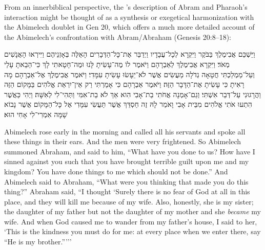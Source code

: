 From an innerbiblical perspective, the \ga's description of Abram and Pharaoh's interaction might be thought of as a synthesis or exegetical harmonization with the Abimelech doublet in Gen 20, which offers a much more detailed account of the Abimelech's confrontation with Abram/Abraham (Genesis 20:8--18):

\begin{hebrewtext}
    וַיַּשְׁכֵּם אֲבִימֶלֶךְ בַּבֹּקֶר וַיִּקְרָא לְכָל־עֲבָדָיו וַיְדַבֵּר אֶת־כָּל־הַדְּבָרִים הָאֵלֶּה בְּאָזְנֵיהֶם וַיִּירְאוּ הָאֲנָשִׁים מְאֹד׃
    וַיִּקְרָא אֲבִימֶלֶךְ לְאַבְרָהָם וַיֹּאמֶר לוֹ מֶה־עָשִׂיתָ לָּנוּ וּמֶה־חָטָאתִי לָךְ כִּי־הֵבֵאתָ עָלַי וְעַל־מַמְלַכְתִּי חֲטָאָה גְדֹלָה מַעֲשִׂים אֲשֶׁר לֹא־יֵעָשׂוּ עָשִׂיתָ עִמָּדִי׃
    וַיֹּאמֶר אֲבִימֶלֶךְ אֶל־אַבְרָהָם מָה רָאִיתָ כִּי עָשִׂיתָ אֶת־הַדָּבָר הַזֶּה׃
    וַיֹּאמֶר אַבְרָהָם כִּי אָמַרְתִּי רַק אֵין־יִרְאַת אֱלֹהִים בַּמָּקוֹם הַזֶּה וַהֲרָגוּנִי עַל־דְּבַר אִשְׁתִּי׃
    וְגַם־אָמְנָה אֲחֹתִי בַת־אָבִי הִוא אַךְ לֹא בַת־אִמִּי וַתְּהִי־לִי לְאִשָּׁה׃
    וַיְהִי כַּאֲשֶׁר הִתְעוּ אֹתִי אֱלֹהִים מִבֵּית אָבִי וָאֹמַר לָהּ זֶה חַסְדֵּךְ אֲשֶׁר תַּעֲשִׂי עִמָּדִי אֶל כָּל־הַמָּקוֹם אֲשֶׁר נָבוֹא שָׁמָּה אִמְרִי־לִי אָחִי הוּא׃
\end{hebrewtext}

\begin{translation}
    Abimelech rose early in the morning and called all his servants and spoke all these things in their ears. And the men were very frightened. 
    So Abimelech summoned Abraham, and said to him, ``What have you done to us? How have I sinned against you such that you have brought terrible guilt upon me and my kingdom? You have done things to me which should not be done.''
    And Abimelech said to Abraham, “What were you thinking that made you do this thing?” 
    Abraham said, ``I thought `Surely there is no fear of God at all in this place, and they will kill me because of my wife. 
    Also, honestly, she is my sister; the daughter of my father but not the daughter of my mother and she \emph{became} my wife.
    And when God caused me to wander from my father's house, I said to her, `This is the kindness you must do for me: at every place when we enter there, say  ``He is my brother.'''''
\end{translation}

